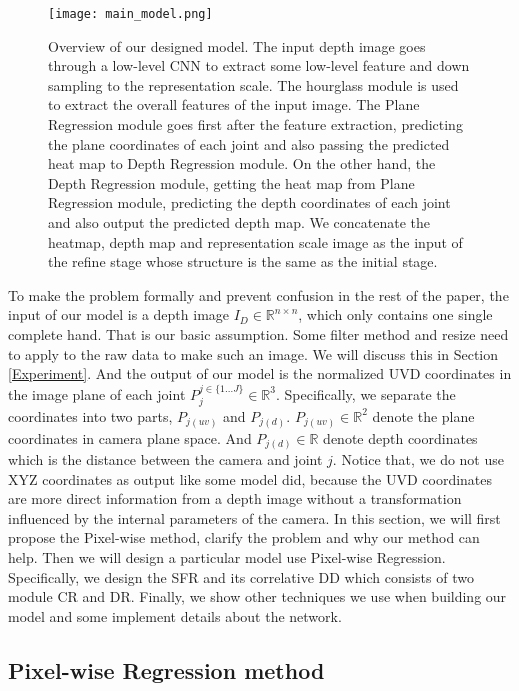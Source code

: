 \documentclass[journal]{IEEEtran}
\begin{document}
\begin{figure*}[!t]
  \centering
  \texttt{[image: main\_model.png]}
  \caption{
  Overview of our designed model. 
  The input depth image goes through a low-level CNN to extract some low-level feature and down sampling to the representation scale. 
  The hourglass module is used to extract the overall features of the input image. 
  The Plane Regression module goes first after the feature extraction, 
  predicting the plane coordinates of each joint and also passing the predicted heat map to Depth Regression module. 
  On the other hand, the Depth Regression module, getting the heat map from Plane Regression module, 
  predicting the depth coordinates of each joint and also output the predicted depth map. 
  We concatenate the heatmap, depth map and representation scale image as the input of the refine stage whose structure is the same as the initial stage.
  }
  \label{model}
\end{figure*}

To make the problem formally and prevent confusion in the rest of the paper,   
the input of our model is a depth image $I_{D} \in \mathbb{R}^{n \times n}$, 
which only contains one single complete hand. 
That is our basic assumption. 
Some filter method and resize need to apply to the raw data to make such an image. 
We will discuss this in Section \ref{Experiment}. 
And the output of our model is the normalized UVD coordinates in the image plane of each joint $P_{j}^{j \in\{1 . . . J\}} \in \mathbb{R}^{3}$. 
Specifically, we separate the coordinates into two parts, $P_{j(u v)}$ and $P_{j(d)}$.
$P_{j(u v)} \in \mathbb{R}^{2}$ denote the plane coordinates in camera plane space. 
And $P_{j(d)} \in \mathbb{R}$ denote depth coordinates which is the distance between the camera and joint $j$. 
Notice that, we do not use XYZ coordinates as output like some model did, 
because the UVD coordinates are more direct information from a depth image without a transformation influenced by the internal parameters of the camera. 
In this section, we will first propose the Pixel-wise method, clarify the problem and why our method can help. 
Then we will design a particular model use Pixel-wise Regression. 
Specifically, we design the SFR and its correlative DD which consists of two module CR and DR. 
Finally, we show other techniques we use when building our model and some implement details about the network.

\subsection{Pixel-wise Regression method}
\end{document}
